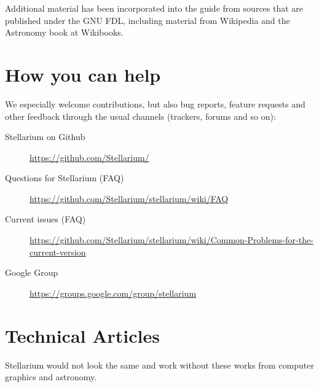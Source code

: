 Additional material has been incorporated into the guide from sources
that are published under the GNU FDL, including material from Wikipedia
and the Astronomy book at Wikibooks.

\section{How you can help}
\label{sec:HowYouCanHelp}

We especially welcome contributions, but also bug reports, feature requests and other feedback through the
usual channels (trackers, forums and so on):
\begin{description}
\item[Stellarium on Github] \url{https://github.com/Stellarium/}
\item[Questions for Stellarium (FAQ)] \url{https://github.com/Stellarium/stellarium/wiki/FAQ}
\item[Current issues (FAQ)] \url{https://github.com/Stellarium/stellarium/wiki/Common-Problems-for-the-current-version}
\item[Google Group] \url{https://groups.google.com/group/stellarium}
\end{description}


\section{Technical Articles}
\label{sec:ack:technical}

Stellarium would not look the same and work without these works from computer graphics and astronomy.

